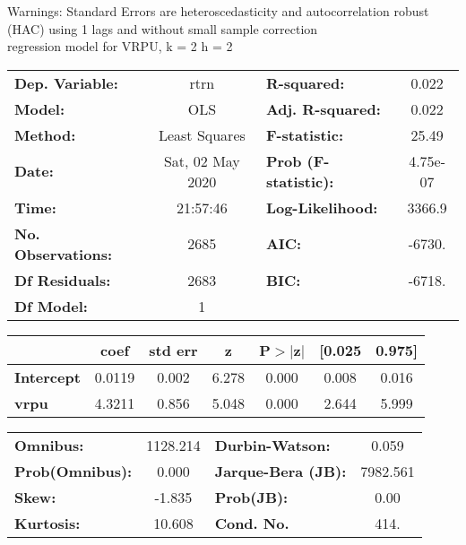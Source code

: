 Warnings: \newline
 [1] Standard Errors are heteroscedasticity and autocorrelation robust (HAC) using 1 lags and without small sample correction\\ 

regression model for VRPU, k = 2 h = 2\begin{center}
\begin{tabular}{lclc}
\toprule
\textbf{Dep. Variable:}    &       rtrn       & \textbf{  R-squared:         } &     0.022   \\
\textbf{Model:}            &       OLS        & \textbf{  Adj. R-squared:    } &     0.022   \\
\textbf{Method:}           &  Least Squares   & \textbf{  F-statistic:       } &     25.49   \\
\textbf{Date:}             & Sat, 02 May 2020 & \textbf{  Prob (F-statistic):} &  4.75e-07   \\
\textbf{Time:}             &     21:57:46     & \textbf{  Log-Likelihood:    } &    3366.9   \\
\textbf{No. Observations:} &        2685      & \textbf{  AIC:               } &    -6730.   \\
\textbf{Df Residuals:}     &        2683      & \textbf{  BIC:               } &    -6718.   \\
\textbf{Df Model:}         &           1      & \textbf{                     } &             \\
\bottomrule
\end{tabular}
\begin{tabular}{lcccccc}
                   & \textbf{coef} & \textbf{std err} & \textbf{z} & \textbf{P$> |$z$|$} & \textbf{[0.025} & \textbf{0.975]}  \\
\midrule
\textbf{Intercept} &       0.0119  &        0.002     &     6.278  &         0.000        &        0.008    &        0.016     \\
\textbf{vrpu}      &       4.3211  &        0.856     &     5.048  &         0.000        &        2.644    &        5.999     \\
\bottomrule
\end{tabular}
\begin{tabular}{lclc}
\textbf{Omnibus:}       & 1128.214 & \textbf{  Durbin-Watson:     } &    0.059  \\
\textbf{Prob(Omnibus):} &   0.000  & \textbf{  Jarque-Bera (JB):  } & 7982.561  \\
\textbf{Skew:}          &  -1.835  & \textbf{  Prob(JB):          } &     0.00  \\
\textbf{Kurtosis:}      &  10.608  & \textbf{  Cond. No.          } &     414.  \\
\bottomrule
\end{tabular}
\end{center}

